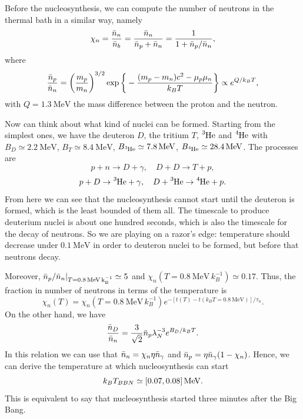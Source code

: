 Before the nucleosynthesis, we can compute the number of neutrons in the thermal bath in a similar way, namely 
\begin{equation}
    \chi_n = \frac{\bar{n}_n}{\bar{n}_b} = \frac{\bar{n}_n}{\bar{n}_p + \bar{n}_n} = \frac{1}{1 + \bar{n}_p/\bar{n}_n},
\end{equation}
where 
\begin{equation}
    \frac{\bar{n}_p}{\bar{n}_n} = \bigg(\frac{m_p}{m_n}\bigg)^{3/2}\exp{\bigg\{-\frac{(m_p - m_n)c^2 - \mu_p\mu_n}{k_BT}\bigg\}} \propto e^{Q/k_BT},
\end{equation}
with $Q = \SI{1.3}{\MeV}$ the mass difference between the proton and the neutron. 

Now can think about what kind of nuclei can be formed. Starting from the simplest ones, we have the deuteron $D$, the tritium $T$, $\ce{^3He}$ and $\ce{^4He}$ with $B_D \simeq \SI{2.2}{\MeV}$, $B_T \simeq \SI{8.4}{\MeV}$, $B_{\ce{^3He}} \simeq \SI{7.8}{\MeV}$, $B_{\ce{^4He}} \simeq \SI{28.4}{\MeV}$. The processes are  
\begin{equation}
    p + n \to D + \gamma,\quad D + D \to T + p,
\end{equation}
\begin{equation}
    p + D \to \ce{^3He} + \gamma,\quad D + \ce{^3He}  \to \ce{^4He} + p.
\end{equation}
From here we can see that the nucleosynthesis cannot start until the deuteron is formed, which is the least bounded of them all. The timescale to produce deuterium nuclei is about one hundred seconds, which is also the timescale for the decay of neutrons. So we are playing on a razor's edge: temperature should decrease under $\SI{0.1}{\MeV}$ in order to deuteron nuclei to be formed, but before that neutrons decay. 

Moreover, $\b{n}_p/\b{n}_n|_{T = \SI{0.8}{\MeV\,k_B^{-1}}} \simeq 5$ and $\chi_n(T = \SI{0.8}{\MeV\,k_B^{-1}}) \simeq 0.17$. Thus, the fraction in number of neutrons in terms of the temperature is
\begin{equation}
    \chi_n(T) = \chi_n(T = \SI{0.8}{\MeV\,k_B^{-1}})e^{-[t(T) - t(k_BT = \SI{0.8}{\MeV})]/\tau_n}.
\end{equation}
On the other hand, we have 
\begin{equation}
    \frac{\bar{n}_D}{\bar{n}_n} = \frac{3}{\sqrt{2}}\bar{n}_p\lambda_N^{-3}e^{B_D/k_BT}. 
\end{equation}
In this relation we can use that $\bar{n}_n = \chi_n\eta\bar{n}_\gamma$ and $\bar{n}_p = \eta\bar{n}_\gamma(1 - \chi_n)$. Hence, we can derive the temperature at which nucleosynthesis can start 
\begin{equation}
    k_BT_{BBN} \simeq [0.07,0.08]\,\mathrm{MeV}.
\end{equation}
This is equivalent to say that nucleosynthesis started three minutes after the Big Bang. 

